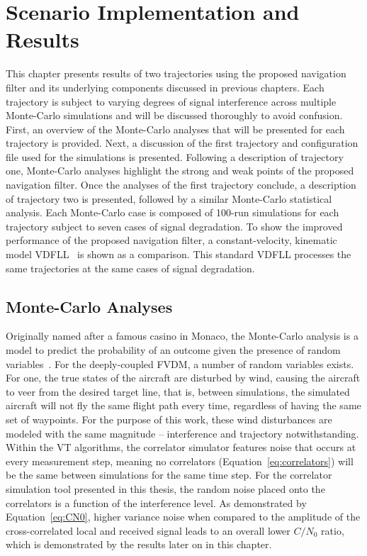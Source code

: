 \chapter{\textbf{Scenario Implementation and Results}}
This chapter presents results of two trajectories using the proposed navigation filter and its underlying components discussed in previous chapters. Each trajectory is subject to varying degrees of signal interference across multiple Monte-Carlo simulations and will be discussed thoroughly to avoid confusion. First, an overview of the Monte-Carlo analyses that will be presented for each trajectory is provided. Next, a discussion of the first trajectory and configuration file used for the simulations is presented. Following a description of trajectory one, Monte-Carlo analyses highlight the strong and weak points of the proposed navigation filter. Once the analyses of the first trajectory conclude, a description of trajectory two is presented, followed by a similar Monte-Carlo statistical analysis. Each Monte-Carlo case is composed of 100-run simulations for each trajectory subject to seven cases of signal degradation. To show the improved performance of the proposed navigation filter, a constant-velocity, kinematic model VDFLL~\cite{grierPositionNavigationTiming} is shown as a comparison. This standard VDFLL processes the same trajectories at the same cases of signal degradation.

\section{\textbf{Monte-Carlo Analyses}}
Originally named after a famous casino in Monaco, the Monte-Carlo analysis is a model to predict the probability of an outcome given the presence of random variables~\cite{mariettaMonteCarloError2013}. For the deeply-coupled FVDM, a number of random variables exists. For one, the true states of the aircraft are disturbed by wind, causing the aircraft to veer from the desired target line, that is, between simulations, the simulated aircraft will not fly the same flight path every time, regardless of having the same set of waypoints. For the purpose of this work, these wind disturbances are modeled with the same magnitude {--} interference and trajectory notwithstanding. Within the VT algorithms, the correlator simulator features noise that occurs at every measurement step, meaning no correlators (Equation~\ref{eq:correlators}) will be the same between simulations for the same time step. For the correlator simulation tool presented in this thesis, the random noise placed onto the correlators is a function of the interference level. As demonstrated by Equation~\ref{eq:CN0}, higher variance noise when compared to the amplitude of the cross-correlated local and received signal leads to an overall lower \(C/N_0\) ratio, which is demonstrated by the results later on in this chapter.

